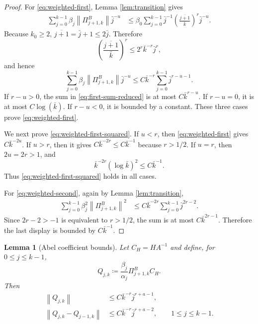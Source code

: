 \documentclass{article}
\newtheorem{lemma}[theorem]{Lemma}
\newcommand{\norm}[1]{\left\lVert #1\right\rVert}
\begin{document}
\begin{proof}
For \eqref{eq:weighted-first}, Lemma \ref{lem:transition} gives
\[
\begin{aligned}
  \sum_{j=0}^{k-1}\beta_j\norm{\Pi^B_{j+1,k}}\bar j^{-u}
  &\le \beta_0\sum_{j=0}^{k-1}\bar j^{-1}\left(\frac{\overline{j+1}}{\bar k}\right)^r\bar j^{-u}.
\end{aligned}
\]
Because $k_0\ge2$, $\overline{j+1}=\bar j+1\le 2\bar j$. Therefore
\[
  \left(\frac{\overline{j+1}}{\bar k}\right)^r\le 2^r\bar k^{-r}\bar j^r,
\]
and hence
\begin{equation}
  \sum_{j=0}^{k-1}\beta_j\norm{\Pi^B_{j+1,k}}\bar j^{-u}
  \le C\bar k^{-r}\sum_{j=0}^{k-1}\bar j^{r-u-1}. \label{eq:first-sum-reduced}
\end{equation}
If $r-u>0$, the sum in \eqref{eq:first-sum-reduced} is at most $C\bar k^{r-u}$. If $r-u=0$, it is at most $C\log(\bar k)$. If $r-u<0$, it is bounded by a constant. These three cases prove \eqref{eq:weighted-first}.

We next prove \eqref{eq:weighted-first-squared}. If $u<r$, then \eqref{eq:weighted-first} gives $C\bar k^{-2u}$. If $u>r$, then it gives $C\bar k^{-2r}\le C\bar k^{-1}$ because $r>1/2$. If $u=r$, then $2u=2r>1$, and
\[
  \bar k^{-2r}(\log\bar k)^2\le C\bar k^{-1}.
\]
Thus \eqref{eq:weighted-first-squared} holds in all cases.

For \eqref{eq:weighted-second}, again by Lemma \ref{lem:transition},
\[
\begin{aligned}
  \sum_{j=0}^{k-1}\beta_j^2\norm{\Pi^B_{j+1,k}}^2
  &\le C\bar k^{-2r}\sum_{j=0}^{k-1}\bar j^{2r-2}.
\end{aligned}
\]
Since $2r-2>-1$ is equivalent to $r>1/2$, the sum is at most $C\bar k^{2r-1}$. Therefore the last display is bounded by $C\bar k^{-1}$.
\end{proof}

\begin{lemma}[Abel coefficient bounds]\label{lem:abel-coefficients}
Let $C_H=HA^{-1}$ and define, for $0\le j\le k-1$,
\begin{equation}
  Q_{j,k}\coloneqq \frac{\beta_j}{\alpha_j}\Pi^B_{j+1,k}C_H. \label{eq:Q-def}
\end{equation}
Then
\begin{align}
  \norm{Q_{j,k}} &\le C\bar k^{-r}\bar j^{r+a-1}, \label{eq:Q-size}\\
  \norm{Q_{j,k}-Q_{j-1,k}} &\le C\bar k^{-r}\bar j^{r+a-2},
  \qquad 1\le j\le k-1. \label{eq:Q-variation}
\end{align}
\end{lemma}
\end{document}
